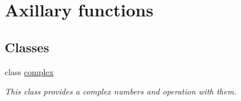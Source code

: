 \hypertarget{group___ax_func}{}\section{Axillary functions}
\label{group___ax_func}
\subsection*{Classes}
\begin{DoxyCompactItemize}
\item 
class \mbox{\hyperlink{classcomplex}{complex}}
\begin{DoxyCompactList}\small\item\em This class provides a complex numbers and operation with them. \end{DoxyCompactList}\end{DoxyCompactItemize}
